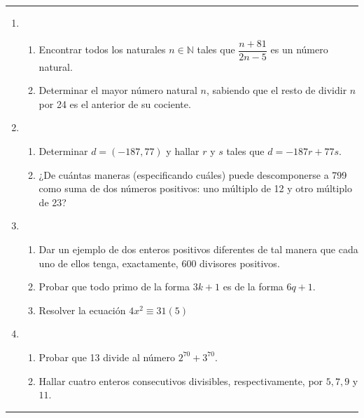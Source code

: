 \documentclass[9pt,a4paper]{extarticle}
\begin{document}
\hrule
{}
\begin{enumerate}
    \item 
    \begin{enumerate}
        \item Encontrar todos los naturales $n \in \mathbb{N}$ tales que $\dfrac{n+81}{2n-5}$ es un número natural.
        \item Determinar el mayor número natural $n$, sabiendo que el resto de dividir $n$ por 24 es el anterior de su cociente.
    \end{enumerate}
    
    \item 
    \begin{enumerate}
        \item Determinar $d=(-187,77)$ y hallar $r$ y $s$ tales que $d=-187r+77s$.
        \item ¿De cuántas maneras (especificando cuáles) puede descomponerse a 799 como suma de dos números positivos: uno múltiplo de 12 y otro múltiplo de 23?
    \end{enumerate}
    
    \item
    \begin{enumerate}
        \item Dar un ejemplo de dos enteros positivos diferentes de tal manera que cada uno de ellos tenga, exactamente, 600 divisores positivos. 
        \item Probar que todo primo de la forma $3k+1$ es de la forma $6q+1$.
        \item Resolver la ecuación $4x^2 \equiv 31(5)$
    \end{enumerate}
    
    \item
    \begin{enumerate}
        \item Probar que 13 divide al número $2^{70} + 3^{70}$.
        \item Hallar cuatro enteros consecutivos divisibles, respectivamente, por $5, 7, 9$ y $11$.
    \end{enumerate}
    
\end{enumerate}
\hrule
\end{document}
